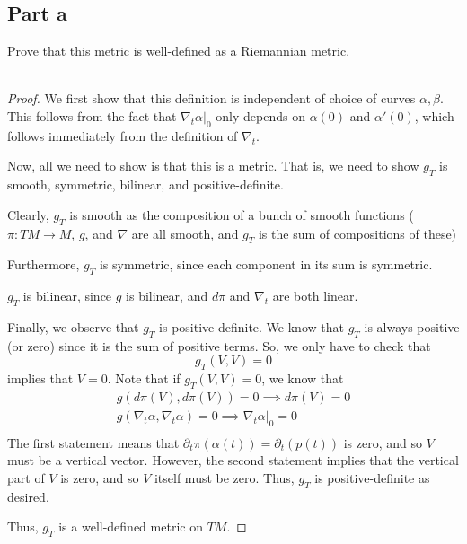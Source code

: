 \documentclass[fontsize=11pt]{scrartcl} %
\numberwithin{equation}{section} %
\numberwithin{figure}{section} %
\numberwithin{table}{section} %
\begin{document}
\subsection{Part a}
Prove that this metric is well-defined as a Riemannian metric.
\\
\\
\begin{proof}
    We first show that this definition is independent of choice of curves
    $\alpha,\beta$. This follows from the fact that $\nabla_t\alpha|_0$ only
    depends on $\alpha(0)$ and $\alpha'(0)$, which follows immediately from the
    definition of $\nabla_t$.

    Now, all we need to show is that this is a metric. That is, we need to show
    $g_T$ is smooth, symmetric, bilinear, and positive-definite.

    Clearly, $g_T$ is smooth as the composition of a bunch of smooth functions
    ($\pi:TM\to M$, $g$, and $\nabla$ are all smooth, and $g_T$ is the sum of
    compositions of these)

    Furthermore, $g_T$ is symmetric, since each component in its sum is
    symmetric.

    $g_T$ is bilinear, since $g$ is bilinear, and $d\pi$ and $\nabla_t$ are both
    linear.

    Finally, we observe that $g_T$ is positive definite. We know that $g_T$ is
    always positive (or zero) since it is the sum of positive terms. So, we only
    have to check that
    \[
        g_T(V,V)=0
    \]
    implies that $V=0$. Note that if $g_T(V,V)=0$, we know that
    \[
\begin{aligned}
    g(d\pi(V),d\pi(V)) = 0 \implies d\pi(V)=0\\
    g(\nabla_t\alpha,\nabla_t\alpha) = 0\implies \nabla_t\alpha|_0 = 0\\
\end{aligned}
    \]
    The first statement means that $\partial_t\pi(\alpha(t))=\partial_t(p(t))$
    is zero, and so $V$ must be a vertical vector. However, the second statement
    implies that the vertical part of $V$ is zero, and so $V$ itself must be
    zero. Thus, $g_T$ is positive-definite as desired.

    Thus, $g_T$ is a well-defined metric on $TM$.
\end{proof}
\end{document}
